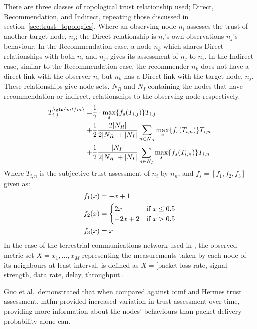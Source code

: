 There are three classes of topological trust relationship used; Direct, Recommendation, and Indirect, repeating those discussed in section~\ref{sec:trust_topologies}.
Where an observing node $n_i$ assesses the trust of another target node, $n_j$; the Direct relationship is $n_i$'s own observations $n_j$'s behaviour.
In the Recommendation case, a node $n_k$ which shares Direct relationships with both $n_i$ and $n_j$, gives its assessment of $n_j$ to $n_i$.
In the Indirect case, similar to the Recommendation case, the recommender $n_k$ does not have a direct link with the observer $n_i$ but $n_k$ has a Direct link with the target node, $n_j$.
These relationships give node sets, $N_R$ and $N_I$ containing the nodes that have recommendation or indirect, relationships to the observing node respectively.
%
\begin{align}
  \label{eq:networkeffects}
  T_{i,j}^{\gls{mtfm}}=&\frac{1}{2} \cdot \max_s\{f_s(T_{i,j})\} T_{i,j}\\ \notag
  +&\frac{1}{2} \frac{2|N_R| }{2|N_R| + |N_I|}\sum_{n \in N_R} \max_s\{f_s(T_{i,n})\} T_{i,n}\\ \notag
  +&\frac{1}{2} \frac{|N_I| }{2|N_R| + |N_I|}\sum_{n \in N_I} \max_s\{f_s(T_{i,n})\} T_{i,n} 
\end{align}
Where $T_{i,n}$ is the subjective trust assessment of $n_i$ by $n_n$, and $f_s = [ f_1,f_2, f_3]$ given as:
\begin{align}
  \label{eq:whitenization}
  f_1(x)&= -x+1\notag\\
  f_2(x)&= 
  \begin{cases}
    2x & \text{if }x\leq 0.5\\
    -2x+2 & \text{if }x>0.5
  \end{cases}\\
  f_3(x)&= x\notag
\end{align}
%
In the case of the terrestrial communications network used in \cite{Guo11}, the observed metric set $X = {x_1,\dots,x_M}$ representing the measurements taken by each node of its neighbours at least interval, is defined as $X=[$packet loss rate, signal strength, data rate, delay, throughput$]$.

Guo et al.\ demonstrated that when compared against \gls{otmf} and Hermes trust assessment, \gls{mtfm} provided increased variation in trust assessment over time, providing more information about the nodes' behaviours than packet delivery probability alone can.
